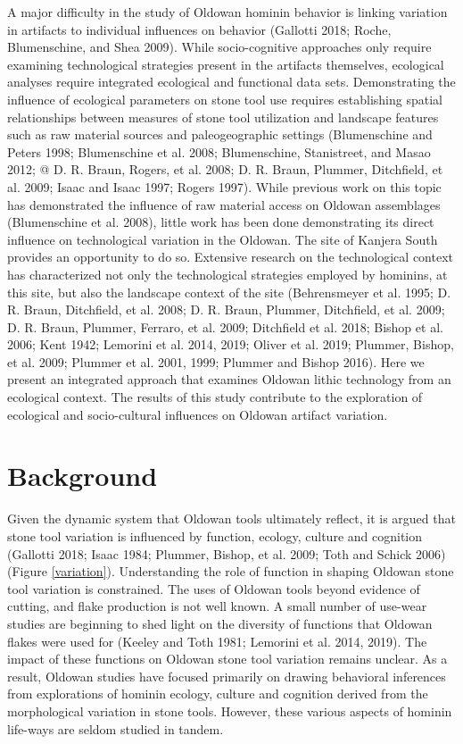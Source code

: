 \documentclass[]{elsarticle} %
\begin{document}
A major difficulty in the study of Oldowan hominin behavior is linking
variation in artifacts to individual influences on behavior (Gallotti
2018; Roche, Blumenschine, and Shea 2009). While socio-cognitive
approaches only require examining technological strategies present in
the artifacts themselves, ecological analyses require integrated
ecological and functional data sets. Demonstrating the influence of
ecological parameters on stone tool use requires establishing spatial
relationships between measures of stone tool utilization and landscape
features such as raw material sources and paleogeographic settings
(Blumenschine and Peters 1998; Blumenschine et al. 2008; Blumenschine,
Stanistreet, and Masao 2012; @ D. R. Braun, Rogers, et al. 2008; D. R.
Braun, Plummer, Ditchfield, et al. 2009; Isaac and Isaac 1997; Rogers
1997). While previous work on this topic has demonstrated the influence
of raw material access on Oldowan assemblages (Blumenschine et al.
2008), little work has been done demonstrating its direct influence on
technological variation in the Oldowan. The site of Kanjera South
provides an opportunity to do so. Extensive research on the
technological context has characterized not only the technological
strategies employed by hominins, at this site, but also the landscape
context of the site (Behrensmeyer et al. 1995; D. R. Braun, Ditchfield,
et al. 2008; D. R. Braun, Plummer, Ditchfield, et al. 2009; D. R. Braun,
Plummer, Ferraro, et al. 2009; Ditchfield et al. 2018; Bishop et al.
2006; Kent 1942; Lemorini et al. 2014, 2019; Oliver et al. 2019;
Plummer, Bishop, et al. 2009; Plummer et al. 2001, 1999; Plummer and
Bishop 2016). Here we present an integrated approach that examines
Oldowan lithic technology from an ecological context. The results of
this study contribute to the exploration of ecological and
socio-cultural influences on Oldowan artifact variation.

\hypertarget{background}{%
\section{Background}\label{background}}

Given the dynamic system that Oldowan tools ultimately reflect, it is
argued that stone tool variation is influenced by function, ecology,
culture and cognition (Gallotti 2018; Isaac 1984; Plummer, Bishop, et
al. 2009; Toth and Schick 2006) (Figure \ref{variation}). Understanding
the role of function in shaping Oldowan stone tool variation is
constrained. The uses of Oldowan tools beyond evidence of cutting, and
flake production is not well known. A small number of use-wear studies
are beginning to shed light on the diversity of functions that Oldowan
flakes were used for (Keeley and Toth 1981; Lemorini et al. 2014, 2019).
The impact of these functions on Oldowan stone tool variation remains
unclear. As a result, Oldowan studies have focused primarily on drawing
behavioral inferences from explorations of hominin ecology, culture and
cognition derived from the morphological variation in stone tools.
However, these various aspects of hominin life-ways are seldom studied
in tandem.
\end{document}
